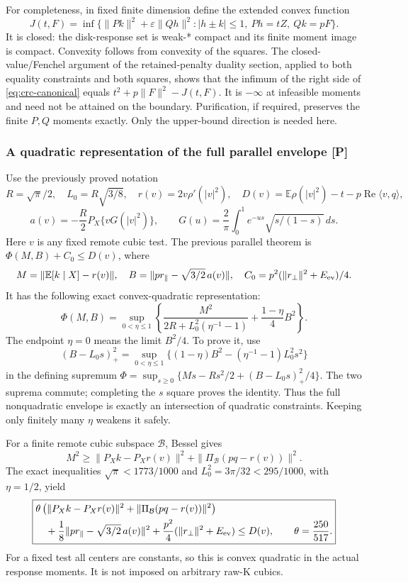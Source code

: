 For completeness, in fixed finite dimension define the extended convex
function
\[
 J(t,F)=\inf\{\|Pk\|^2+\varepsilon\|Qh\|^2:
             |h\pm k|\le1,\ Ph=tZ,\ Qk=pF\}.
\]
It is closed: the disk-response set is weak-* compact and its finite
moment image is compact. Convexity follows from convexity of the squares.
The closed-value/Fenchel argument of the retained-penalty duality section,
applied to both equality constraints and both squares, shows that the
infimum of the right side of \eqref{eq:crc-canonical} equals
$t^2+p\|F\|^2-J(t,F)$. It is $-\infty$ at infeasible moments and need not
be attained on the boundary. Purification, if required, preserves the
finite $P,Q$ moments exactly. Only the upper-bound direction is needed here.

\subsubsection{A quadratic representation of the full parallel envelope [P]}
Use the previously proved notation
\[
 R=\sqrt\pi/2,\quad L_0=R\sqrt{3/8},\quad
 r(v)=2v\rho'(|v|^2),\quad
 D(v)=\mathbb E\rho(|v|^2)-t-p\operatorname{Re}\langle v,q\rangle,
\]
\[
 a(v)=-\frac R2P_X\{vG(|v|^2)\},\qquad
 G(u)=\frac2\pi\int_0^1e^{-us}\sqrt{s/(1-s)}\,ds.
\]
Here $v$ is any fixed remote cubic test. The previous parallel theorem is
$\Phi(M,B)+C_0\le D(v)$, where
\[
 M=\|\mathbb E[k\mid X]-r(v)\|,\quad
 B=\|p r_\parallel-\sqrt{3/2}\,a(v)\|,\quad
 C_0=p^2(\|r_\perp\|^2+E_{\rm ev})/4.
\]
It has the following exact convex-quadratic representation:
\begin{equation}\label{eq:crc-eta}
 \boxed{\Phi(M,B)=\sup_{0<\eta\le1}
 \left\{\frac{M^2}{2R+L_0^2(\eta^{-1}-1)}
                    +\frac{1-\eta}{4}B^2\right\}.}
\end{equation}
The endpoint $\eta=0$ means the limit $B^2/4$.
To prove it, use
\[
 (B-L_0s)_+^2=
 \sup_{0<\eta\le1}\{(1-\eta)B^2-(\eta^{-1}-1)L_0^2s^2\}
\]
in the defining supremum
$\Phi=\sup_{s\ge0}\{Ms-Rs^2/2+(B-L_0s)_+^2/4\}$.
The two suprema commute; completing the $s$ square proves the identity.
Thus the full nonquadratic envelope is exactly an intersection of
quadratic constraints. Keeping only finitely many $\eta$ weakens it safely.

For a finite remote cubic subspace $\mathcal B$, Bessel gives
\[
 M^2\ge \|P_Xk-P_Xr(v)\|^2
        +\|\Pi_{\mathcal B}(pq-r(v))\|^2.
\]
The exact inequalities $\sqrt\pi<1773/1000$ and
$L_0^2=3\pi/32<295/1000$, with $\eta=1/2$, yield
\begin{equation}\label{eq:crc-rational-cut}
\boxed{\begin{aligned}
 &\theta\left(\|P_Xk-P_Xr(v)\|^2+
                \|\Pi_{\mathcal B}(pq-r(v))\|^2\right)\\
 &\quad+\frac18\|p r_\parallel-\sqrt{3/2}\,a(v)\|^2
       +\frac{p^2}{4}(\|r_\perp\|^2+E_{\rm ev})\le D(v),
 \qquad \theta=\frac{250}{517}.
\end{aligned}}
\end{equation}
For a fixed test all centers are constants, so this is convex quadratic
in the actual response moments. It is not imposed on arbitrary raw-K cubics.

